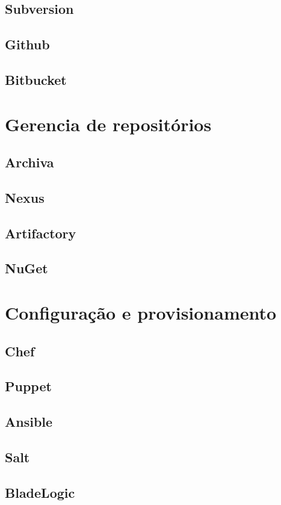 	\subsection{Subversion}
	\subsection{Github}
	\subsection{Bitbucket}
	
	
    \section{Gerencia de repositórios}

	\subsection{Archiva}
	\subsection{Nexus}
	\subsection{Artifactory}
	\subsection{NuGet}
	
    \section{Configuração e provisionamento}

	\subsection{Chef}
	\subsection{Puppet}
	\subsection{Ansible}
	\subsection{Salt}
	\subsection{BladeLogic}
